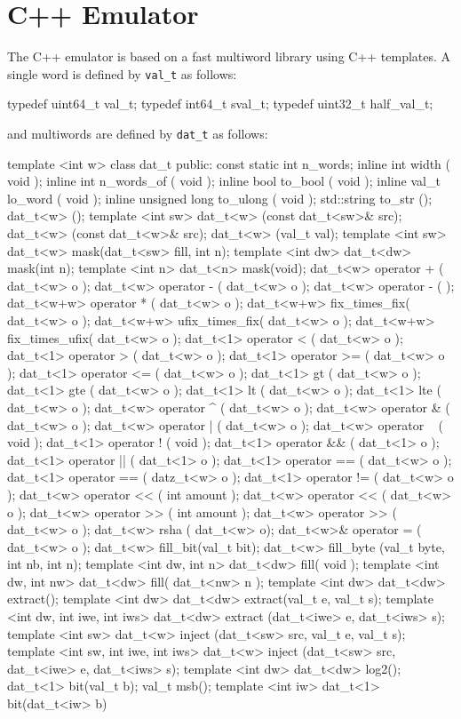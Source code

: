 \documentclass[10pt,twocolumn]{article}
\def\code#1{{\small\tt #1}}
\begin{document}
\section{C++ Emulator}

The C++ emulator is based on a fast multiword library using
C++ templates.  
A single word is defined by \code{val\_t} as follows: 

\begin{cpp}
typedef uint64_t val_t;
typedef int64_t sval_t; 
typedef uint32_t half_val_t;
\end{cpp}

\noindent
and multiwords are defined by \code{dat\_t} as follows:

\begin{cpp}
template <int w>
class dat_t {
 public:
  const static int n_words;
  inline int width ( void );
  inline int n_words_of ( void );
  inline bool to_bool ( void );
  inline val_t lo_word ( void );
  inline unsigned long to_ulong ( void );
  std::string to_str ();
  dat_t<w> ();
template <int sw> 
  dat_t<w> (const dat_t<sw>& src);
  dat_t<w> (const dat_t<w>& src);
  dat_t<w> (val_t val);
template <int sw> 
  dat_t<w> mask(dat_t<sw> fill, int n);
template <int dw> 
  dat_t<dw> mask(int n);
template <int n> 
  dat_t<n> mask(void);
  dat_t<w> operator + ( dat_t<w> o );
  dat_t<w> operator - ( dat_t<w> o );
  dat_t<w> operator - ( );
  dat_t<w+w> operator * ( dat_t<w> o );
  dat_t<w+w> fix_times_fix( dat_t<w> o );
  dat_t<w+w> ufix_times_fix( dat_t<w> o );
  dat_t<w+w> fix_times_ufix( dat_t<w> o );
  dat_t<1> operator < ( dat_t<w> o );
  dat_t<1> operator > ( dat_t<w> o );
  dat_t<1> operator >= ( dat_t<w> o );
  dat_t<1> operator <= ( dat_t<w> o );
  dat_t<1> gt ( dat_t<w> o );
  dat_t<1> gte ( dat_t<w> o );
  dat_t<1> lt ( dat_t<w> o );
  dat_t<1> lte ( dat_t<w> o );
  dat_t<w> operator ^ ( dat_t<w> o );
  dat_t<w> operator & ( dat_t<w> o );
  dat_t<w> operator | ( dat_t<w> o );
  dat_t<w> operator ~ ( void );
  dat_t<1> operator ! ( void );
  dat_t<1> operator && ( dat_t<1> o );
  dat_t<1> operator || ( dat_t<1> o );
  dat_t<1> operator == ( dat_t<w> o );
  dat_t<1> operator == ( datz_t<w> o );
  dat_t<1> operator != ( dat_t<w> o );
  dat_t<w> operator << ( int amount );
  dat_t<w> operator << ( dat_t<w> o );
  dat_t<w> operator >> ( int amount );
  dat_t<w> operator >> ( dat_t<w> o );
  dat_t<w> rsha ( dat_t<w> o);
  dat_t<w>& operator = ( dat_t<w> o );
  dat_t<w> fill_bit(val_t bit);
  dat_t<w> fill_byte
    (val_t byte, int nb, int n);
template <int dw, int n> 
  dat_t<dw> fill( void );
template <int dw, int nw> 
  dat_t<dw> fill( dat_t<nw> n );
template <int dw> 
  dat_t<dw> extract();
template <int dw> 
  dat_t<dw> extract(val_t e, val_t s);
template <int dw, int iwe, int iws> 
  dat_t<dw> extract
    (dat_t<iwe> e, dat_t<iws> s);
template <int sw> 
  dat_t<w> inject
    (dat_t<sw> src, val_t e, val_t s);
template <int sw, int iwe, int iws> 
  dat_t<w> inject
    (dat_t<sw> src, 
     dat_t<iwe> e, dat_t<iws> s);
template <int dw> 
  dat_t<dw> log2();
  dat_t<1> bit(val_t b);
  val_t msb();
template <int iw>
  dat_t<1> bit(dat_t<iw> b)
}
\end{cpp}
\end{document}
